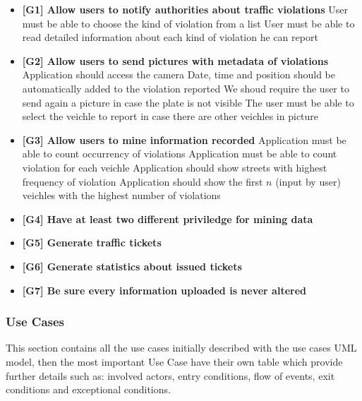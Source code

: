 \begin{itemize}

\item \textbf{[G1] Allow users to notify authorities about traffic violations} %
   User must be able to choose the kind of violation from a list
   User must be able to read detailed information about each kind of violation he can report

\item \textbf{[G2] Allow users to send pictures with metadata of violations } %
   Application should access the camera
   Date, time and position should be automatically added to the violation reported
   We shoud require the user to send again a picture in case the plate is not visible
   The user must be able to select the veichle to report in case there are other veichles in picture

\item \textbf{[G3] Allow users to mine information recorded}  %
   Application must be able to count occurrency of violations
    Application must be able to count violation for each veichle
   Application should show streets with highest frequency of violation
  \req {}  Application should show the first $n$ (input by user) veichles with the highest number of violations
\item \textbf{[G4] Have at least two different priviledge for mining data} %

\item \textbf{[G5] Generate traffic tickets}
\item \textbf{[G6] Generate statistics about issued tickets}
\item \textbf{[G7] Be sure every information uploaded is never altered}


\end{itemize}




\subsubsection{Use Cases}
This section contains all the use cases initially described with the use cases UML model, then the most important Use Case have their own table which provide further details such as:  involved actors, entry conditions,  ﬂow of events, exit conditions and exceptional conditions.


